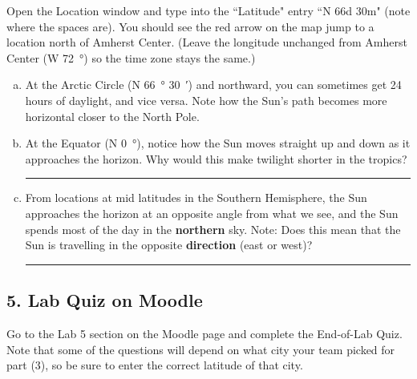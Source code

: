 \documentclass[main.tex]{subfiles}
\begin{document}
Open the Location window and type into the ``Latitude" entry ``N 66d 30m" (note where the spaces are). You should see the red arrow on the map jump to a location north of Amherst Center. (Leave the longitude unchanged from Amherst Center (W \SI{72}{\degree}) so the time zone stays the same.)
\begin{enumerate} [a.]
\item At the Arctic Circle (N \SI{66}{\degree} \SI{30}{\arcminute}) and northward, you can sometimes get 24 hours of daylight, and vice versa. Note how the Sun's path becomes more horizontal closer to the North Pole.

\item At the Equator (N \SI{0}{\degree}), notice how the Sun moves straight up and down as it approaches the horizon. Why would this make twilight shorter in the tropics?\\

\rule{15cm}{.2mm}


\item From locations at mid latitudes in the Southern Hemisphere, the Sun approaches the horizon at an opposite angle from what we see, and the Sun spends most of the day in the \textbf{northern} sky. Note: Does this mean that the Sun is travelling in the opposite \textbf{direction} (east or west)?\\

\rule{15cm}{.2mm}

\end{enumerate}

\subsection*{5. Lab Quiz on Moodle}
Go to the Lab 5 section on the Moodle page and complete the End-of-Lab Quiz. Note that some of the questions will depend on what city your team picked for part (3), so be sure to enter the correct latitude of that city.

\end{document}
